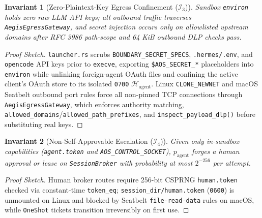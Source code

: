 \documentclass[10pt,twocolumn]{article}
\newtheorem{invariant}{Invariant}
\begin{document}
\begin{invariant}[Zero-Plaintext-Key Egress Confinement ($\mathcal{I}_3$)]
\label{inv:egress}
Sandbox \texttt{environ} holds zero raw LLM API keys; all outbound traffic traverses \texttt{AegisEgressGateway}, and secret injection occurs only on allowlisted upstream domains after RFC 3986 path-scope and 64 KiB outbound DLP checks pass.
\end{invariant}
\begin{proof}[Proof Sketch]
\texttt{launcher.rs} scrubs \texttt{BOUNDARY\_SECRET\_SPECS}, \texttt{.hermes/.env}, and \texttt{opencode} API keys prior to \texttt{execve}, exporting \texttt{\$AOS\_SECRET\_*} placeholders into \texttt{environ} while unlinking foreign-agent OAuth files and confining the active client's OAuth store to its isolated \texttt{0700} $\mathcal{H}_{\text{agent}}$. Linux \texttt{CLONE\_NEWNET} and macOS Seatbelt outbound port rules force all non-pinned TCP connections through \texttt{AegisEgressGateway}, which enforces authority matching, \texttt{allowed\_domains}/\texttt{allowed\_path\_prefixes}, and \texttt{inspect\_payload\_dlp()} before substituting real keys.
\end{proof}

\begin{invariant}[Non-Self-Approvable Escalation ($\mathcal{I}_4$)]
\label{inv:broker}
Given only in-sandbox capabilities (\texttt{agent.token} and \texttt{AOS\_CONTROL\_SOCKET}), $p_{\text{agent}}$ forges a human approval or lease on \texttt{SessionBroker} with probability at most $2^{-256}$ per attempt.
\end{invariant}
\begin{proof}[Proof Sketch]
Human broker routes require 256-bit CSPRNG \texttt{human.token} checked via constant-time \texttt{token\_eq}; \texttt{session\_dir/human.token} (\texttt{0600}) is unmounted on Linux and blocked by Seatbelt \texttt{file-read-data} rules on macOS, while \texttt{OneShot} tickets transition irreversibly on first use.
\end{proof}
\end{document}
